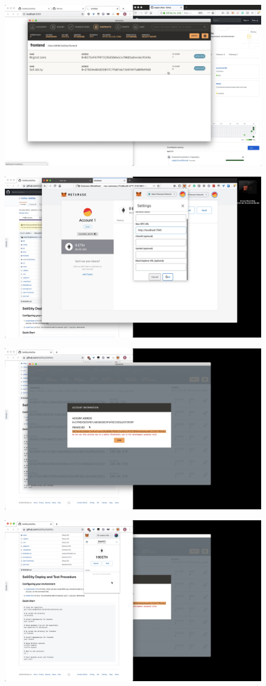 \documentclass[12pt]{article}
\renewcommand{\_}{\kern-1.5pt\textunderscore\kern-1.5pt}
\begin{document}
\includegraphics[height=7cm]{graphs/08. ganache_deployed_contract}

\includegraphics[height=7cm]{graphs/09. metamask_setup_network}

\includegraphics[height=7cm]{graphs/10. metamask_setup_bob}

\includegraphics[height=7cm]{graphs/11. metamask_setup_bob}
\end{document}
